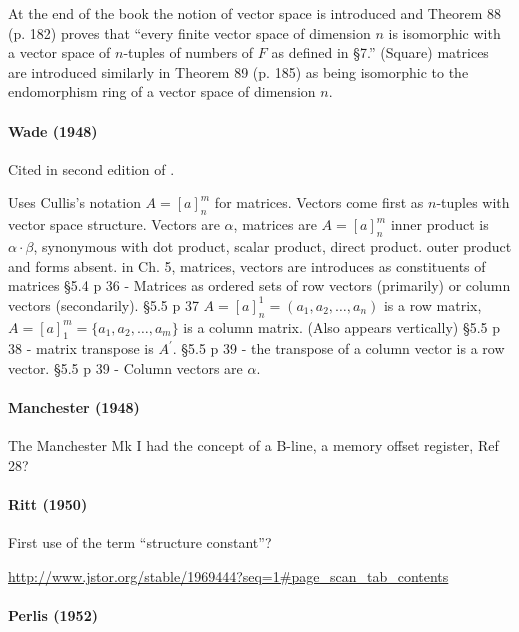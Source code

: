 At the end of the book the notion of vector space is introduced and Theorem 88
(p. 182) proves that ``every finite vector space of dimension $n$ is isomorphic with a
vector space of $n$-tuples of numbers of $F$ as defined in \S7.''
(Square) matrices are introduced similarly in Theorem 89 (p. 185) as being
isomorphic to the endomorphism ring of a vector space of dimension $n$.


\paragraph{Wade (1948)~\cite{Wade1948}}

Cited in second edition of \cite{Margenau1943}.

Uses Cullis's notation $A = {[a]}^m_n$ for matrices.
Vectors come first as $n$-tuples with vector space structure.
Vectors are $\alpha$, matrices are $A = {[a]}^m_n$
inner product is $\alpha \cdot \beta$, synonymous with dot product, scalar product, direct product.
outer product and forms absent.
in Ch. 5, matrices, vectors are introduces as constituents of matrices
\S 5.4 p 36 - Matrices as ordered sets of row vectors (primarily) or column vectors (secondarily).
\S 5.5 p 37 $A = {[a]}^1_n = (a_1, a_2, \dots, a_n)$ is a row matrix,
$A = {[a]}^m_1 = \{a_1, a_2, \dots, a_m \}$ is a column matrix. (Also appears vertically)
\S 5.5 p 38 - matrix transpose is $A^\prime$.
\S 5.5 p 39 - the transpose of a column vector is a row vector.
\S 5.5 p 39 - Column vectors are $\alpha$.



\paragraph{Manchester (1948)}

The Manchester Mk I had the concept of a B-line, a memory offset register, Ref 28?



\paragraph{Ritt (1950)~\cite{Ritt1950}}

First use of the term ``structure constant''?

\url{http://www.jstor.org/stable/1969444?seq=1#page_scan_tab_contents}


\paragraph{Perlis (1952)~\cite{Perlis1952}}

